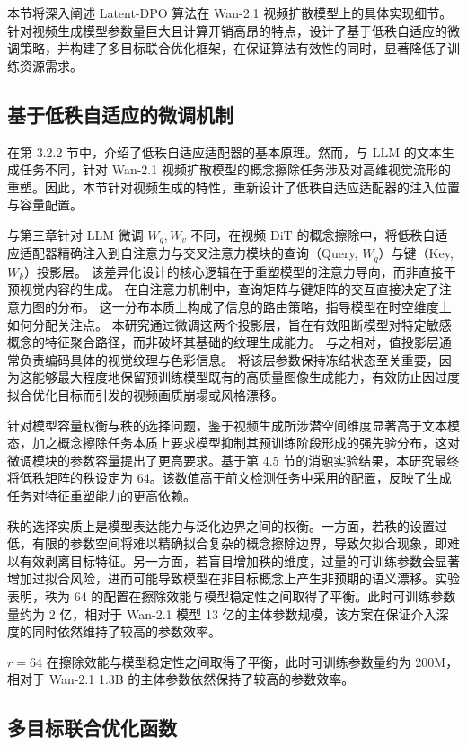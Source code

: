 本节将深入阐述 Latent-DPO 算法在 Wan-2.1 视频扩散模型上的具体实现细节。
针对视频生成模型参数量巨大且计算开销高昂的特点，设计了基于低秩自适应的微调策略，并构建了多目标联合优化框架，在保证算法有效性的同时，显著降低了训练资源需求。

\subsection{基于低秩自适应的微调机制}

在第 3.2.2 节中，介绍了低秩自适应适配器的基本原理。然而，与 LLM 的文本生成任务不同，针对 Wan-2.1 视频扩散模型的概念擦除任务涉及对高维视觉流形的重塑。因此，本节针对视频生成的特性，重新设计了低秩自适应适配器的注入位置与容量配置。

与第三章针对 LLM 微调 $W_q, W_v$ 不同，在视频 DiT 的概念擦除中，将低秩自适应适配器精确注入到自注意力与交叉注意力模块的查询（Query, $W_q$）与键（Key, $W_k$）投影层。
该差异化设计的核心逻辑在于重塑模型的注意力导向，而非直接干预视觉内容的生成。
在自注意力机制中，查询矩阵与键矩阵的交互直接决定了注意力图的分布。
这一分布本质上构成了信息的路由策略，指导模型在时空维度上如何分配关注点。
本研究通过微调这两个投影层，旨在有效阻断模型对特定敏感概念的特征聚合路径，而非破坏其基础的纹理生成能力。
与之相对，值投影层通常负责编码具体的视觉纹理与色彩信息。
将该层参数保持冻结状态至关重要，因为这能够最大程度地保留预训练模型既有的高质量图像生成能力，有效防止因过度拟合优化目标而引发的视频画质崩塌或风格漂移。

针对模型容量权衡与秩的选择问题，鉴于视频生成所涉潜空间维度显著高于文本模态，加之概念擦除任务本质上要求模型抑制其预训练阶段形成的强先验分布，这对微调模块的参数容量提出了更高要求。基于第 4.5 节的消融实验结果，本研究最终将低秩矩阵的秩设定为 64。该数值高于前文检测任务中采用的配置，反映了生成任务对特征重塑能力的更高依赖。

秩的选择实质上是模型表达能力与泛化边界之间的权衡。一方面，若秩的设置过低，有限的参数空间将难以精确拟合复杂的概念擦除边界，导致欠拟合现象，即难以有效剥离目标特征。另一方面，若盲目增加秩的维度，过量的可训练参数会显著增加过拟合风险，进而可能导致模型在非目标概念上产生非预期的语义漂移。实验表明，秩为 64 的配置在擦除效能与模型稳定性之间取得了平衡。此时可训练参数量约为 2 亿，相对于 Wan-2.1 模型 13 亿的主体参数规模，该方案在保证介入深度的同时依然维持了较高的参数效率。

$r=64$ 在擦除效能与模型稳定性之间取得了平衡，此时可训练参数量约为 200M，相对于 Wan-2.1 1.3B 的主体参数依然保持了较高的参数效率。

\subsection{多目标联合优化函数}

